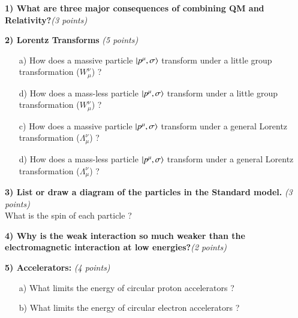{\large


\textbf{1) What are three major consequences of combining QM and Relativity?}\hfill \textit{(3 points)}\\

\vspace{2.5in}


\textbf{2) Lorentz Transforms } \hfill \textit{(5 points)}\\
\begin{itemize}
\item[a)] How does a massive particle $\ket{p^\mu,\sigma}$ transform under a little group transformation ($W_\mu^\nu$)  ?
\vspace*{0.75in}
\item[d)] How does a mass-less particle $\ket{p^\mu,\sigma}$ transform under a little group transformation ($W_\mu^\nu$)  ?
\vspace*{0.75in}
\item[c)] How does a massive particle $\ket{p^\mu,\sigma}$ transform under a general Lorentz transformation ($\Lambda_\mu^\nu$)  ?
\vspace*{0.75in}
\item[d)] How does a mass-less particle $\ket{p^\mu,\sigma}$ transform under a general Lorentz transformation ($\Lambda_\mu^\nu$)  ?

\end{itemize}


\textbf{3) List or draw a diagram of the particles in the Standard model. } \hfill \textit{(3 points)}\\
What is the spin of each particle ?

\vspace*{3in}


\textbf{4) Why is the weak interaction so much weaker than the electromagnetic interaction at low energies?}\hfill \textit{(2 points)}\\

\vspace{1in}

\textbf{5) Accelerators: } \hfill \textit{(4 points)}
\begin{itemize}
\item[a)]{What limits the energy of circular proton accelerators ?
\vspace*{1.0in}
}
\item[b)]{What limits the energy of circular electron accelerators ?
\vspace*{1.0in}
}
\end{itemize}


}
